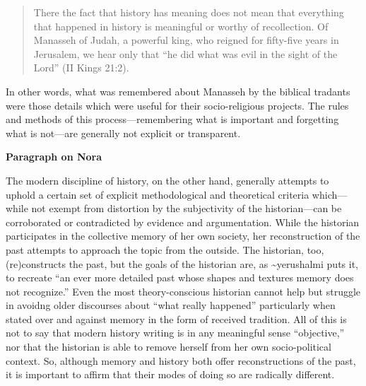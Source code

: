 \begin{quote}
There the fact that history has meaning does not mean that everything
that happened in history is meaningful or worthy of recollection. Of
Manasseh of Judah, a powerful king, who reigned for fifty-five years in
Jerusalem, we hear only that ``he did what was evil in the sight of the
Lord'' (II Kings 21:2).\autocite[10]{yerushalmi1989}
\end{quote}

In other words, what was remembered about Manasseh by the biblical
tradants were those details which were useful for their socio-religious
projects. The rules and methods of this process---remembering what is
important and forgetting what is not---are generally not explicit or
transparent.

\textbf{Paragraph on Nora}

The modern discipline of history, on the other hand, generally attempts
to uphold a certain set of explicit methodological and theoretical
criteria which---while not exempt from distortion by the subjectivity of
the historian---can be corroborated or contradicted by evidence and
argumentation.\autocite[As Daniel Pioske puts it, ``What separates the
act of historiography from the recounting of a culture's sanctioned
memories is consequently the historians' determination to isolate and
compare disparate testimonies about the past with other past traces that
ma corroborate or discredit their
claims.''][302--303]{pioske_bibint2015} While the historian participates
in the collective memory of her own society, her reconstruction of the
past attempts to approach the topic from the outside. The historian,
too, (re)constructs the past, but the goals of the historian are, as
\textasciitilde{}yerushalmi puts it, to recreate ``an ever more detailed
past whose shapes and textures memory does not
recognize.''\autocites[94]{yerushalmi1989}[See
also][532]{verovsek_pgi2016} Even the most theory-conscious historian
cannot help but struggle in avoidng older discourses about ``what really
happened'' particularly when stated over and against memory in the form
of received tradition. All of this is not to say that modern history
writing is in any meaningful sense ``objective,'' nor that the historian
is able to remove herself from her own socio-political context. So,
although memory and history both offer reconstructions of the past, it
is important to affirm that their modes of doing so are radically
different.\autocite[Pioske observes, ``The epistemological tension
observed by Ricoeur between memory and history is thus understood as the
outcome of two processes that, though having the similar intent of
re-presenting former phenomena, nevertheless pursue and mediate the past
through quite disparate means.''][302]{pioske_bibint2015}

